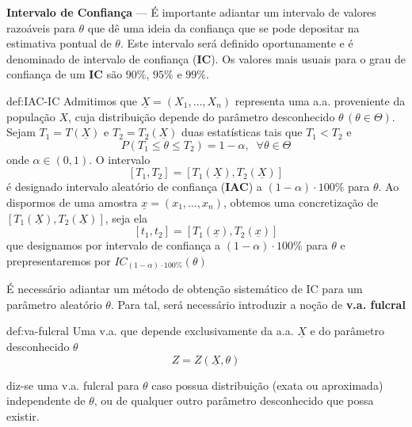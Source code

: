 \noindent \textbf{Intervalo de Confiança} --- É importante adiantar um intervalo de valores razoáveis para $\theta$ que dê uma ideia da confiança que se pode depositar na estimativa pontual de $\theta$. Este intervalo será definido oportunamente e é denominado de intervalo de confiança (\textbf{IC}). Os valores mais usuais para o grau de confiança de um \textbf{IC} são $90\%$, $95\%$ e $99\%$.


\begin{theo}{def:IAC-IC}\label{def:IAC-IC}
    \noindent Admitimos que $\underline{X} = (X_1, \dots, X_n)$ representa uma a.a. proveniente da população $X$, cuja distribuição depende do parâmetro desconhecido $\theta\, (\theta \in \Theta)$. Sejam $T_1 = T(\underline{X})$ e $T_2 = T_2(\underline{X})$ duas estatísticas tais que $T_1 < T_2$ e 
    $$
        P(T_1 \leq \theta \leq T_2) = 1 - \alpha,\;\; \forall \theta \in \Theta
    $$
    \noindent onde $\alpha \in (0,1)$. O intervalo
    $$
        [T_1, T_2] = [T_1(\underline{X}), T_2(\underline{X})]
    $$
    \noindent é designado intervalo aleatório de confiança (\textbf{IAC}) a $(1 - \alpha) \cdot 100 \%$ para $\theta$. Ao dispormos de uma amostra $\underline{x} = (x_1, \dots, x_n)$, obtemos uma concretização de $[T_1(\underline{X}), T_2(\underline{X})]$, seja ela  
    $$
        [t_1, t_2] = [T_1(\underline{x}), T_2(\underline{x})]
    $$
    \noindent que designamos por intervalo de confiança a $(1 - \alpha) \cdot 100 \%$ para $\theta$ e prepresentaremos por $IC_{(1 - \alpha) \cdot 100 \%}(\theta)$
\end{theo}

\noindent É necessário adiantar um método de obtenção sistemático de IC para um parâmetro aleatório $\theta$. Para tal, será necessário introduzir a noção de \textbf{v.a. fulcral}

\begin{theo}{def:va-fulcral}\label{def:va-fulcral}
    \noindent Uma v.a. que depende exclusivamente da a.a. $\underline{X}$ e do parâmetro desconhecido $\theta$
    $$
        Z = Z(\underline{X}, \theta)
    $$

    \vspace{-1 em}
    \noindent diz-se uma v.a. fulcral para $\theta$ caso possua distribuição (exata ou aproximada) independente de $\theta$, ou de qualquer outro parâmetro desconhecido que possa existir.
\end{theo}

